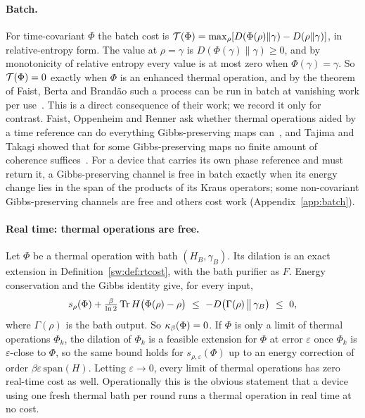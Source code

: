 \paragraph{Batch.} For time-covariant $\Phi$ the batch cost is $\mathcal T(\Phi)=\max_\rho[D(\Phi(\rho)\|\gamma)-D(\rho\|\gamma)]$, in relative-entropy form. The value at $\rho=\gamma$ is $D(\Phi(\gamma)\|\gamma)\ge0$, and by monotonicity of relative entropy every value is at most zero when $\Phi(\gamma)=\gamma$. So $\mathcal T(\Phi)=0$ exactly when $\Phi$ is an enhanced thermal operation, and by the theorem of Faist, Berta and Brand\~ao such a process can be run in batch at vanishing work per use~\cite{FBB21}. This is a direct consequence of their work; we record it only for contrast. Faist, Oppenheim and Renner ask whether thermal operations aided by a time reference can do everything Gibbs-preserving maps can~\cite{FOR15}, and Tajima and Takagi showed that for some Gibbs-preserving maps no finite amount of coherence suffices~\cite{TajimaTakagi25}. For a device that carries its own phase reference and must return it, a Gibbs-preserving channel is free in batch exactly when its energy change lies in the span of the products of its Kraus operators; some non-covariant Gibbs-preserving channels are free and others cost work (Appendix~\ref{app:batch}).

\paragraph{Real time: thermal operations are free.} Let $\Phi$ be a thermal operation with bath $(H_B,\gamma_B)$. Its dilation is an exact extension in Definition~\ref{sw:def:rtcost}, with the bath purifier as $F$. Energy conservation and the Gibbs identity give, for every input,
\[
s_\rho(\Phi)+\tfrac{\beta}{\ln2}\Tr H\bigl(\Phi(\rho)-\rho\bigr)\ \le\ -D\bigl(\Gamma(\rho)\,\big\|\,\gamma_B\bigr)\ \le\ 0,
\]
where $\Gamma(\rho)$ is the bath output. So $\kappa_\beta(\Phi)=0$. If $\Phi$ is only a limit of thermal operations $\Phi_k$, the dilation of $\Phi_k$ is a feasible extension for $\Phi$ at error $\varepsilon$ once $\Phi_k$ is $\varepsilon$-close to $\Phi$, so the same bound holds for $s_{\rho,\varepsilon}(\Phi)$ up to an energy correction of order $\beta\varepsilon\,\mathrm{span}(H)$. Letting $\varepsilon\to0$, every limit of thermal operations has zero real-time cost as well. Operationally this is the obvious statement that a device using one fresh thermal bath per round runs a thermal operation in real time at no cost.

